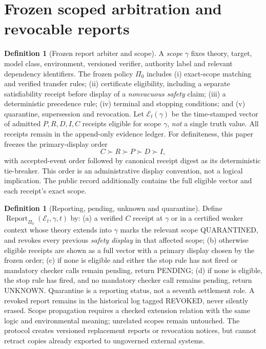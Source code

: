 \documentclass[11pt,letterpaper,oneside]{book}
\theoremstyle{definition}
\newtheorem{definition}[theorem]{Definition}
\theoremstyle{remark}
\begin{document}
\section{Frozen scoped arbitration and revocable reports}
\begin{definition}[Frozen report arbiter and scope]
A \emph{scope} $\gamma$ fixes theory, target, model class, environment,
versioned verifier, authority label and relevant dependency identifiers.
The frozen policy $\Pi_0$ includes (i) exact-scope matching and verified
transfer rules; (ii) certificate eligibility, including a separate
satisfiability receipt before display of a \emph{nonvacuous safety}
claim; (iii) a deterministic precedence rule; (iv) terminal and
stopping conditions; and (v) quarantine, supersession and revocation.
Let $\mathcal E_t(\gamma)$ be the time-stamped vector of admitted
$P,R,D,I,C$ receipts eligible for scope $\gamma$, \emph{not} a single
truth value. All receipts remain in the append-only evidence ledger.
For definiteness, this paper freezes the primary-display order
\[
 C\succ R\succ P\succ D\succ I,
\]
with accepted-event order followed by canonical receipt digest as
its deterministic tie-breaker. This order is an administrative display
convention, not a logical implication. The public record additionally
contains the full eligible vector and each receipt's exact scope.
\end{definition}
\begin{definition}[Reporting, pending, unknown and quarantine]
Define $\operatorname{Report}_{\Pi_0}(\mathcal E_t,\gamma,t)$ by:
(a) a verified $C$ receipt at $\gamma$ or in a certified weaker
context whose theory extends into $\gamma$ marks the relevant scope
\textsf{QUARANTINED}, and revokes every previous \emph{safety display}
in that affected scope; (b) otherwise eligible receipts are shown as
a full vector with a primary display chosen by the frozen order;
(c) if none is eligible and either the stop rule has not fired or
mandatory checker calls remain pending, return \textsf{PENDING};
(d) if none is eligible, the stop rule has fired, and no mandatory
checker call remains pending, return \textsf{UNKNOWN}. Quarantine is a reporting status,
not a seventh settlement role. A revoked report remains in the
historical log tagged \textsf{REVOKED}, never silently erased. Scope
propagation requires a checked extension relation with the same
logic and environmental meaning; unrelated scopes remain untouched.
The protocol creates versioned replacement reports or revocation
notices, but cannot retract copies already exported to ungoverned
external systems.
\end{definition}
\end{document}
